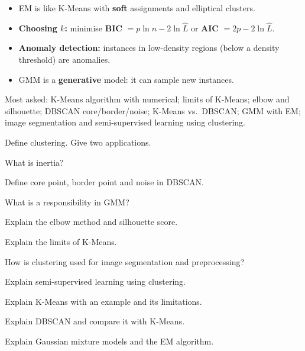 \begin{itemize}
  \item EM is like K-Means with \textbf{soft} assignments and elliptical clusters.
  \item \textbf{Choosing $k$:} minimise \textbf{BIC} $=p\ln n-2\ln\hat L$ or \textbf{AIC} $=2p-2\ln\hat L$.
  \item \textbf{Anomaly detection:} instances in low-density regions (below a density threshold) are anomalies.
  \item GMM is a \textbf{generative} model: it can sample new instances.
\end{itemize}

\begin{imp}
Most asked: K-Means algorithm with numerical; limits of K-Means; elbow and silhouette; DBSCAN core/border/noise; K-Means vs.\ DBSCAN; GMM with EM; image segmentation and semi-supervised learning using clustering.
\end{imp}

\begin{iq}
\item \twom Define clustering. Give two applications.
\item \twom What is inertia?
\item \twom Define core point, border point and noise in DBSCAN.
\item \twom What is a responsibility in GMM?
\item \fivem Explain the elbow method and silhouette score.
\item \fivem Explain the limits of K-Means.
\item \fivem How is clustering used for image segmentation and preprocessing?
\item \fivem Explain semi-supervised learning using clustering.
\item \tenm Explain K-Means with an example and its limitations.
\item \tenm Explain DBSCAN and compare it with K-Means.
\item \tenm Explain Gaussian mixture models and the EM algorithm.
\end{iq}
